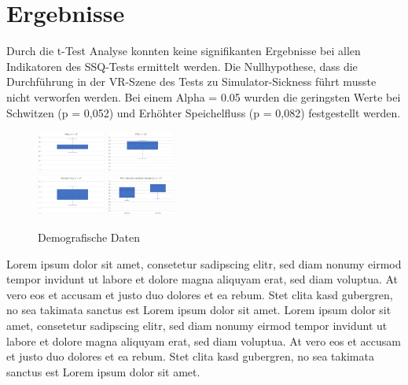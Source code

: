 \documentclass[conference]{IEEEtran}
\begin{document}
\section{Ergebnisse}
Durch die t-Test Analyse konnten keine signifikanten Ergebnisse bei allen Indikatoren des SSQ-Tests ermittelt werden. Die Nullhypothese, dass die Durchführung in der VR-Szene des Tests zu Simulator-Sickness führt musste nicht verworfen werden. Bei einem Alpha = 0.05 wurden die geringsten Werte bei Schwitzen (p = 0,052) und Erhöhter Speichelfluss (p = 0,082) festgestellt werden.\\
\begin{figure}[ht]
	\centering
	\includegraphics[width=0.2\textwidth]{assets/alter.png} \hspace{-5pt}
	\includegraphics[width=0.2\textwidth]{assets/ipd.png} \\
	\vspace{2pt}
	\includegraphics[width=0.2\textwidth]{assets/randot.png} \hspace{-5pt}
	\includegraphics[width=0.2\textwidth]{assets/ipd_mvw.png}\\
	\caption{Demografische Daten}
	\label{fig:Demografische Daten}
\end{figure}
Lorem ipsum dolor sit amet, consetetur sadipscing elitr, sed diam nonumy eirmod tempor invidunt ut labore et dolore magna aliquyam erat, sed diam voluptua. At vero eos et accusam et justo duo dolores et ea rebum. Stet clita kasd gubergren, no sea takimata sanctus est Lorem ipsum dolor sit amet. Lorem ipsum dolor sit amet, consetetur sadipscing elitr, sed diam nonumy eirmod tempor invidunt ut labore et dolore magna aliquyam erat, sed diam voluptua. At vero eos et accusam et justo duo dolores et ea rebum. Stet clita kasd gubergren, no sea takimata sanctus est Lorem ipsum dolor sit amet.
\end{document}
